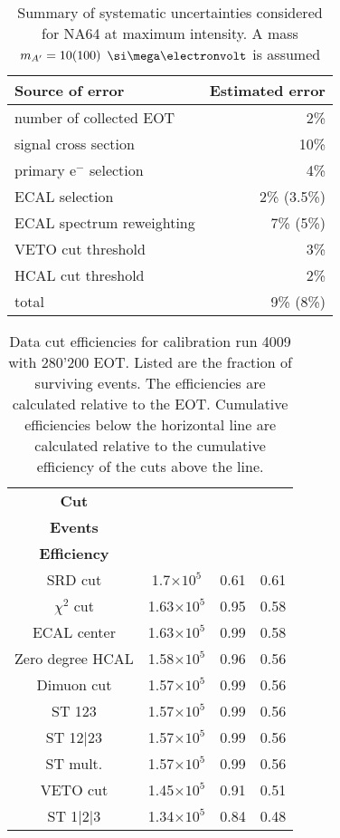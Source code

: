 \begin{table}[htbp]
	\centering
	\caption[Systematic uncertainties in the NA64 experiment]{Summary of systematic uncertainties considered for NA64 at maximum intensity. A mass $m_{A'} = 10(100)$ $\mev$ is assumed \cite{na64-prd}}
	\begin{tabular}{|l|r|}
	\hline
		\textbf{Source of error} & \textbf{Estimated error}\\
        \hline
        number of collected EOT   & 2\% \\
        signal cross section      & 10\% \\
        primary e$^-$ selection   & 4\%  \\
        ECAL selection            & 2\% (3.5\%) \\
        ECAL spectrum reweighting & 7\% (5\%) \\
        VETO cut threshold        & 3\% \\
        HCAL cut threshold        & 2\% \\
        \hline
        total                     & 9\% (8\%) \\
        \hline
	\end{tabular}
	\label{res:Tab:event_selection}
\end{table}

\begin{table}[htbp]
	\centering
	\caption[Data cut efficiencies for calibration run 4009.]{Data cut efficiencies for calibration run 4009 with 280'200 EOT. Listed are the fraction of surviving events. The efficiencies are calculated relative to the EOT. Cumulative efficiencies below the horizontal line are calculated relative to the cumulative efficiency of the cuts above the line.}
	\begin{tabular}{|cccc|}
		\toprule
		\textbf{Cut} & \thead{\textbf{Surviving}\\\textbf{Events}} & \thead{\textbf{Efficiency}}& \thead{\textbf{Cumulative}\\\textbf{Efficiency}}\\
		\midrule
		SRD cut & 1.7$\times 10^5$ & 0.61 & 0.61\\
		$\chi^2$ cut & 1.63$\times 10^5$ & 0.95 & 0.58\\
		ECAL center & 1.63$\times 10^5$ & 0.99 & 0.58\\
		Zero degree HCAL & 1.58$\times 10^5$ & 0.96 & 0.56\\
		Dimuon cut & 1.57$\times 10^5$ & 0.99 & 0.56\\
		\midrule
		ST 123 & 1.57$\times 10^5$ & 0.99 & 0.56\\
		ST 12|23 & 1.57$\times 10^5$ & 0.99 & 0.56\\
		ST mult. & 1.57$\times 10^5$ & 0.99 & 0.56\\ 
		VETO cut  & 1.45$\times 10^5$ & 0.91 & 0.51\\
		ST 1|2|3 & 1.34$\times 10^5$ & 0.84 & 0.48\\
		\bottomrule
	\end{tabular}
	\label{res:Tab:event_selection}
\end{table}

